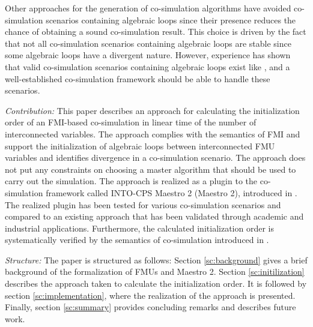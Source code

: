 Other approaches for the generation of co-simulation algorithms have avoided co-simulation scenarios containing algebraic loops since their presence reduces the chance of obtaining a sound co-simulation result\cite{Amalio2016CheckingCo-simulation, BromanCompositionCo-Simulation}. This choice is driven by the fact that not all co-simulation scenarios containing algebraic loops are stable since some algebraic loops have a divergent nature. However, experience has shown that valid co-simulation scenarios containing algebraic loops exist like , and a well-established co-simulation framework should be able to handle these scenarios. 

\textit{Contribution:} This paper describes an approach for calculating the initialization order of an FMI-based co-simulation in linear time of the number of interconnected variables. The approach complies with the semantics of FMI and support the initialization of algebraic loops between interconnected FMU variables and identifies divergence in a co-simulation scenario. The approach does not put any constraints on choosing a master algorithm that should be used to carry out the simulation. 
The approach is realized as a plugin to the co-simulation framework called INTO-CPS Maestro 2 (Maestro 2), introduced in \cite{Thule2019b}.
The realized plugin has been tested for various co-simulation scenarios and compared to an existing approach that has been validated through academic and industrial applications. 
Furthermore, the calculated initialization order is systematically verified by the semantics of co-simulation introduced in \cite{gomes_lucio_vangheluwe_2019,Gomes2019c}. 

\textit{Structure:} The paper is structured as follows: Section \ref{sc:background} gives a brief background of the formalization of FMUs and Maestro 2. Section \ref{sc:initilization} describes the approach taken to calculate the initialization order. It is followed by section \ref{sc:implementation}, where the realization of the approach is presented. Finally, section \ref{sc:summary} provides concluding remarks and describes future work.
